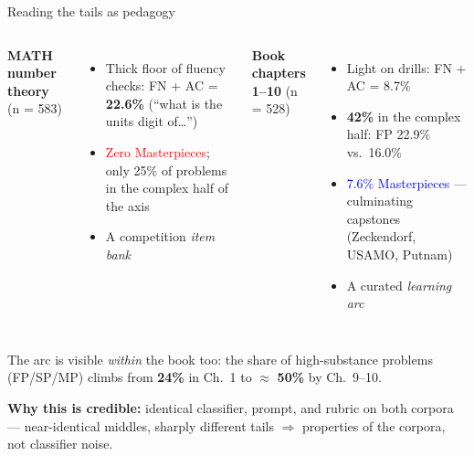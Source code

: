 \documentclass[10pt,aspectratio=169]{beamer}
\newcommand{\good}[1]{\textcolor{blue}{#1}}
\newcommand{\bad}[1]{\textcolor{red}{#1}}
\begin{document}
\begin{frame}{Reading the tails as pedagogy}
  \begin{columns}[T]
    \textbf{MATH number theory} (n = 583)
    \begin{itemize}
      \item Thick floor of fluency checks: FN + AC = \textbf{22.6\%}
            (``what is the units digit of\ldots'')
      \item \bad{Zero Masterpieces}; only 25\% of problems in the complex half of the axis
      \item A competition \emph{item bank}
    \end{itemize}
    \textbf{Book chapters 1--10} (n = 528)
    \begin{itemize}
      \item Light on drills: FN + AC = 8.7\%
      \item \textbf{42\%} in the complex half: FP 22.9\% vs.\ 16.0\%
      \item \good{7.6\% Masterpieces} --- culminating capstones (Zeckendorf, USAMO, Putnam)
      \item A curated \emph{learning arc}
    \end{itemize}
  \end{columns}
  \bigskip
  The arc is visible \emph{within} the book too: the share of high-substance problems
  (FP/SP/MP) climbs from \textbf{24\%} in Ch.\ 1 to $\approx$ \textbf{50\%} by Ch.\ 9--10.
  \smallskip

  \textbf{Why this is credible:} identical classifier, prompt, and rubric on both corpora ---
  near-identical middles, sharply different tails $\Rightarrow$ properties of the corpora,
  not classifier noise.
\end{frame}
\end{document}

